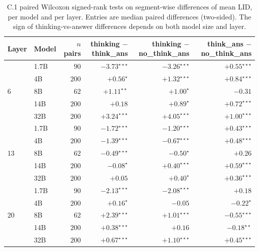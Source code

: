 \documentclass{article}
\theoremstyle{plain}
\theoremstyle{definition}
\theoremstyle{remark}
\begin{document}
\begin{table}[H]
    \centering
    \footnotesize
    \begin{tabular}{llrrrr}
    \toprule
    Layer & Model & $n$ pairs & thinking $-$ think\_ans & thinking $-$ no\_think\_ans & think\_ans $-$ no\_think\_ans \\
    \midrule
    \multirow{5}{*}{6}  & 1.7B & $90$  & $-3.73^{\star\star\star}$ & $-3.26^{\star\star\star}$ & $+0.55^{\star\star\star}$ \\
                       & 4B   & $200$ & $+0.56^{\star}$           & $+1.32^{\star\star\star}$ & $+0.84^{\star\star\star}$ \\
                       & 8B   & $62$  & $+1.11^{\star\star}$      & $+1.00^{\star}$           & $-0.31$ \\
                       & 14B  & $200$ & $+0.18$                   & $+0.89^{\star}$           & $+0.72^{\star\star\star}$ \\
                       & 32B  & $200$ & $+3.24^{\star\star\star}$ & $+4.05^{\star\star\star}$ & $+1.00^{\star\star\star}$ \\
    \midrule
    \multirow{5}{*}{13} & 1.7B & $90$  & $-1.72^{\star\star\star}$ & $-1.20^{\star\star\star}$ & $+0.43^{\star\star\star}$ \\
                       & 4B   & $200$ & $-1.39^{\star\star\star}$ & $-0.67^{\star\star\star}$ & $+0.48^{\star\star\star}$ \\
                       & 8B   & $62$  & $-0.49^{\star\star\star}$ & $-0.50^{\star}$           & $+0.26$ \\
                       & 14B  & $200$ & $-0.08^{\star}$           & $+0.40^{\star\star\star}$ & $+0.59^{\star\star\star}$ \\
                       & 32B  & $200$ & $+0.05$                   & $+0.40^{\star}$           & $+0.36^{\star\star\star}$ \\
    \midrule
    \multirow{5}{*}{20} & 1.7B & $90$  & $-2.13^{\star\star\star}$ & $-2.08^{\star\star\star}$ & $+0.18$ \\
                       & 4B   & $200$ & $+0.16^{\star}$           & $-0.05$                   & $-0.22^{\star}$ \\
                       & 8B   & $62$  & $+2.39^{\star\star\star}$ & $+1.01^{\star\star\star}$ & $-0.55^{\star\star\star}$ \\
                       & 14B  & $200$ & $+0.38^{\star\star\star}$ & $+0.16$                   & $-0.18^{\star\star}$ \\
                       & 32B  & $200$ & $+0.67^{\star\star\star}$ & $+1.10^{\star\star\star}$ & $+0.45^{\star\star\star}$ \\
    \bottomrule
    \end{tabular}
    \caption{C.1 paired Wilcoxon signed-rank tests on segment-wise differences of mean LID, per model and per layer. Entries are median paired differences (two-sided). The sign of thinking-vs-answer differences depends on both model size and layer.}
    \label{tab:c1-wilcoxon-full}
\end{table}
\end{document}
